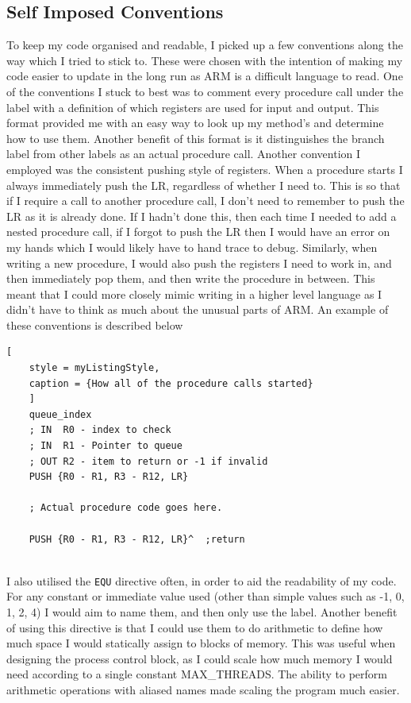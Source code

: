 \subsection{Self Imposed Conventions}
To keep my code organised and readable, I picked up a few conventions along the way which I tried to stick to. These were chosen with the intention of making my code easier to update in the long run as ARM is a difficult language to read. One of the conventions I stuck to best was to comment every procedure call under the label with a definition of which registers are used for input and output. This format provided me with an easy way to look up my method's and determine how to use them. Another benefit of this format is it distinguishes the branch label from other labels as an actual procedure call. Another convention I employed was the consistent pushing style of registers. When a procedure starts I always immediately push the LR, regardless of whether I need to. This is so that if I require a call to another procedure call, I don't need to remember to push the LR as it is already done. If I hadn't done this, then each time I needed to add a nested procedure call, if I forgot to push the LR then I would have an error on my hands which I would likely have to hand trace to debug. Similarly, when writing a new procedure, I would also push the registers I need to work in, and then immediately pop them, and then write the procedure in between. This meant that I could more closely mimic writing in a higher level language as I didn't have to think as much about the unusual parts of ARM. An example of these conventions is described below
\begin{lstlisting}[
	style = myListingStyle,
	caption = {How all of the procedure calls started}
	]
	queue_index
	; IN  R0 - index to check
	; IN  R1 - Pointer to queue
	; OUT R2 - item to return or -1 if invalid
	PUSH {R0 - R1, R3 - R12, LR}
	
	; Actual procedure code goes here.	
	
	PUSH {R0 - R1, R3 - R12, LR}^  ;return
	
\end{lstlisting}
I also utilised the \verb|EQU| directive often, in order to aid the readability of my code. For any constant or immediate value used (other than simple values such as -1, 0, 1, 2, 4) I would aim to name them, and then only use the label. Another benefit of using this directive is that I could use them to do arithmetic to define how much space I would statically assign to blocks of memory. This was useful when designing the process control block, as I could scale how much memory I would need according to a single constant MAX\_THREADS. The ability to perform arithmetic operations with aliased names made scaling the program much easier. 
